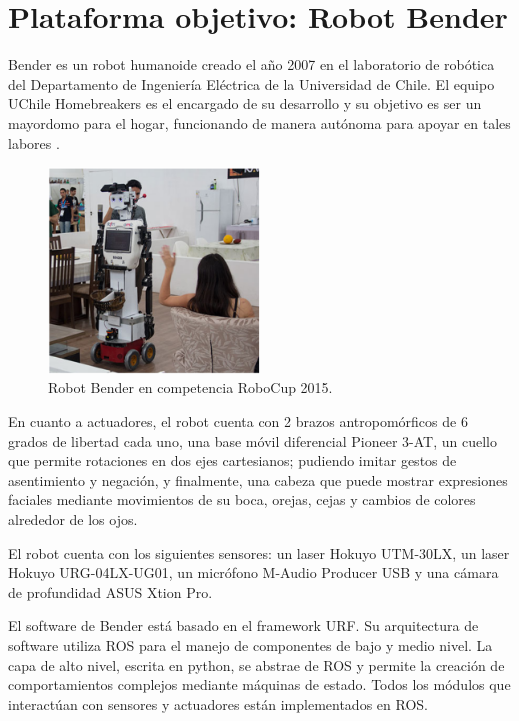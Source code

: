 \section{Plataforma objetivo: Robot Bender}

Bender es un robot humanoide creado el año 2007 en el laboratorio de robótica del Departamento de Ingeniería Eléctrica de la Universidad de Chile. El equipo UChile Homebreakers es el encargado de su desarrollo y  su objetivo es ser un mayordomo para el hogar, funcionando de manera autónoma para apoyar en tales labores \cite{uchile-robotics}.

\begin{figure}[H]
\centering
\includegraphics[width=0.5\textwidth]{./figures/bender.png}
\caption{\small Robot Bender en competencia RoboCup 2015.}
\label{img:bender}
\end{figure}


En cuanto a actuadores, el robot cuenta con 2 brazos antropomórficos de 6 grados de libertad cada uno, una base móvil diferencial Pioneer 3-AT, un cuello que permite rotaciones en dos ejes cartesianos; pudiendo imitar gestos de asentimiento y negación, y finalmente, una cabeza que puede mostrar expresiones faciales mediante movimientos de su boca, orejas, cejas y cambios de colores alrededor de los ojos.

El robot cuenta con los siguientes sensores: un laser Hokuyo UTM-30LX, un laser Hokuyo URG-04LX-UG01, un micrófono M-Audio Producer USB y una cámara de profundidad ASUS Xtion Pro.

El software de Bender está basado en el framework URF. Su arquitectura de software utiliza  ROS para el manejo de componentes de bajo y medio nivel. La capa de alto nivel, escrita en python, se abstrae de ROS y permite la creación de comportamientos complejos mediante máquinas de estado. Todos los módulos que interactúan con sensores y actuadores están implementados en ROS.



